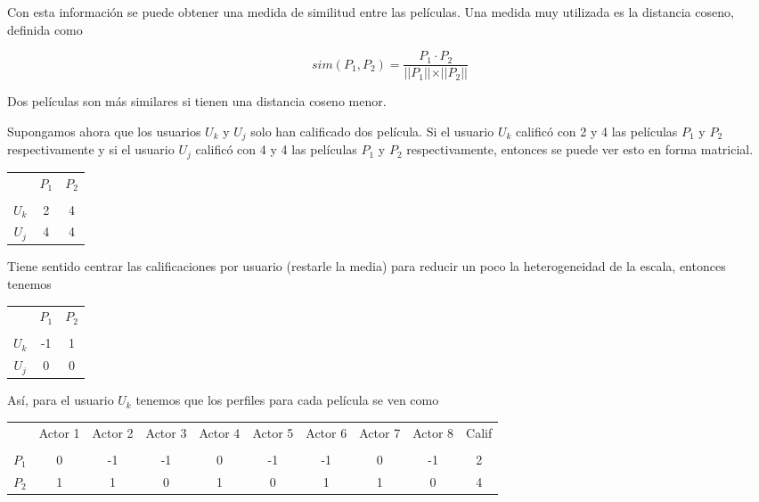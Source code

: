 Con esta información se puede obtener una medida de similitud entre las películas. Una medida muy utilizada es la distancia coseno, definida como

\begin{equation}
sim(P_1, P_2) = \dfrac{P_1 \cdot P_2}{\vert \vert P_1 \vert \vert \times \vert \vert P_2 \vert \vert}
\end{equation}

Dos películas son más similares si tienen una distancia coseno menor.

Supongamos ahora que los usuarios $U_k$ y $U_j$ solo han calificado dos película. Si el usuario $U_k$ calificó con 2 y 4 las películas $P_1$ y $P_2$ respectivamente y si el usuario $U_j$ calificó con 4 y 4 las películas $P_1$ y $P_2$ respectivamente, entonces se puede ver esto en forma matricial.

\begin{center}
\begin{tabular}{ c | c  c }
    & $P_1$ & $P_2$ \\ \\
  \hline                       
$U_k$ & 2 & 4 \\
$U_j$ & 4 & 4 \\
  \hline  
\end{tabular}
\end{center}

Tiene sentido centrar las calificaciones por usuario (restarle la media) para reducir un poco la heterogeneidad de la escala, entonces tenemos

\begin{center}
\begin{tabular}{ c | c  c }
    & $P_1$ & $P_2$ \\ \\
  \hline                       
$U_k$ & -1 & 1 \\
$U_j$ & 0 & 0 \\
  \hline  
\end{tabular}
\end{center}

Así, para el usuario $U_k$ tenemos que los perfiles para cada película se ven como

\begin{center}
\begin{tabular}{ c | c  c c c c c c c c}
    & Actor 1 & Actor 2 & Actor 3 & Actor 4 & Actor 5 & Actor 6 & Actor 7 & Actor 8 & Calif \\ \\
  \hline                       
$P_1$ & 0 & -1 & -1 & 0 & -1 & -1 & 0 & -1 & 2 \\
$P_2$ & 1 & 1 & 0 & 1 & 0 & 1 & 1 & 0 & 4 \\
  \hline  
\end{tabular}
\end{center}

